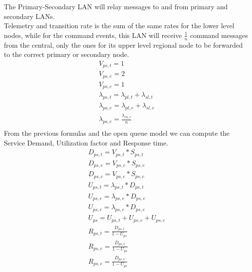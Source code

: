 \documentclass[11pt]{article}
\begin{document}
The Primary-Secondary LAN will relay messages to and from primary and secondary LANs.\\
Telemetry and transition rate is the sum of the same rates for the lower level nodes, while for the command events, this LAN will receive $\frac{1}{n}$ command messages from the central, only the ones for its upper level regional node to be forwarded to the correct primary or secondary node.\\
\begin{equation}
    \begin{array}{l}
        V_{ps, t} = 1 \\
        V_{ps, e} = 2 \\ %
        V_{ps,c} = 1 \\
				\lambda_{ps, t} = \lambda_{pl, t} + \lambda_{sl,t} \\
				\lambda_{ps, e} = \lambda_{pl, e} + \lambda_{sl,e} \\
				\lambda_{ps, c} = \frac{\lambda_{cn, c}}{n} \\
    \end{array}
\end{equation}
From the previous formulas and the open queue model we can compute the Service Demand, Utilization factor and Response time.
\begin{equation}
    \begin{array}{l}
        D_{ps, t} = V_{ps, t} * S_{ps, t} \\
        D_{ps, e} = V_{ps, e} * S_{ps, e} \\
        D_{ps, c} = V_{ps, c} * S_{ps, c} \\
        U_{ps, t} = \lambda_{ps, t} * D_{ps, t} \\
        U_{ps, e} = \lambda_{ps, e} * D_{ps, e} \\
        U_{ps, c} = \lambda_{ps, c} * D_{ps, c} \\
        U_{ps} = U_{ps, t} + U_{ps, e} + U_{ps, c} \\
        R_{ps, t} = \frac{D_{ps, t}}{1 - U_{ps}} \\
        R_{ps, e} = \frac{D_{ps, e}}{1 - U_{ps}} \\
        R_{ps, c} = \frac{D_{ps, c}}{1 - U_{ps}} \\
    \end{array}
\end{equation}
\end{document}
